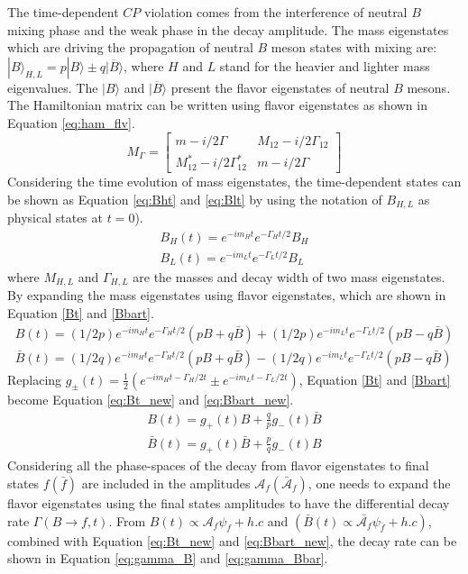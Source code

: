 The time-dependent $CP$ violation comes from the interference of neutral $B$ mixing phase and the weak phase in the decay amplitude. The mass eigenstates which are driving the propagation of neutral $B$ meson states with mixing are: $|B\rangle_{H,L}=p|B\rangle \pm q|\overline{B}\rangle $, where $H$ and $L$ stand for the heavier and lighter mass eigenvalues. The $|B\rangle$ and $|\overline{B}\rangle$ present the flavor eigenstates of neutral $B$ mesons.
The Hamiltonian matrix can be written using flavor eigenstates as shown in Equation \ref{eq:ham_flv}.
\begin{equation}\label{eq:ham_flv}
M_\Gamma=
\begin{bmatrix}
m-i/2\Gamma & M_{12}-i/2\Gamma_{12}\\
M^*_{12}-i/2\Gamma^*_{12}& m-i/2\Gamma 
\end{bmatrix}
\end{equation}
Considering the time evolution of mass eigenstates, the time-dependent states can be shown as Equation \ref{eq:Bht} and \ref{eq:Blt} by using the notation of $B_{H,L}$ as physical states at $t = 0$).
\begin{eqnarray}
B_H(t)=e^{-im_Ht}e^{-\Gamma_Ht/2}B_H \label{eq:Bht}\\
B_L(t)=e^{-im_Lt}e^{-\Gamma_Lt/2}B_L\label{eq:Blt}
\end{eqnarray}
where $M_{H,L}$ and $\Gamma_{H,L}$ are the masses and decay width of two mass eigenstates. By expanding the mass eigenstates using flavor eigenstates, which are shown in Equation \ref{Bt} and \ref{Bbart}.
\begin{eqnarray}
B(t)=(1/2p)e^{-im_Ht}e^{-\Gamma_Ht/2}(pB+q\bar{B})+(1/2p)e^{-im_Lt}e^{-\Gamma_Lt/2}(pB-q\bar{B}) \label{Bt}\\
\bar{B}(t)=(1/2q)e^{-im_Ht}e^{-\Gamma_Ht/2}(pB+q\bar{B})-(1/2q)e^{-im_Lt}e^{-\Gamma_Lt/2}(pB-q\bar{B})\label{Bbart}
\end{eqnarray}
Replacing $g_{\pm}(t)=\frac{1}{2}(e^{-im_Ht-\Gamma_H/2t}\pm e^{-im_Lt-\Gamma_L/2t})$, Equation \ref{Bt} and \ref{Bbart} become Equation \ref{eq:Bt_new} and \ref{eq:Bbart_new}.
\begin{eqnarray}
B(t)=g_{+}(t)B +\frac{q}{p}g_{-}(t)\bar{B} \label{eq:Bt_new}\\
\bar{B}(t)=g_{+}(t)\bar{B} + \frac{p}{q}g_{-}(t){B}\label{eq:Bbart_new}
\end{eqnarray}
Considering all the phase-spaces of the decay from flavor eigenstates to final states $f(\bar{f})$ are included in the amplitudes $\mathcal{A}_f (\bar{\mathcal{A}}_f)$, one needs to expand the flavor eigenstates using the final states amplitudes to have the differential decay rate $\Gamma(B\to f,t)$. From $B(t) \propto \mathcal{A}_f\psi_f+h.c $ and $ (\bar{B}(t) \propto \bar{\mathcal{A}_f}\psi_{\bar{f}}+h.c)$, combined with Equation \ref{eq:Bt_new} and \ref{eq:Bbart_new}, the decay rate can be shown in Equation \ref{eq:gamma_B} and \ref{eq:gamma_Bbar}.
